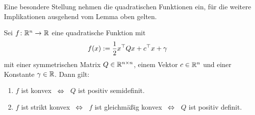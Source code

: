 
Eine besondere Stellung nehmen die quadratischen Funktionen ein, für die weitere Implikationen ausgehend vom Lemma oben gelten.

\begin{lemma} \label{lemma: quadratischeFunktion}
	Sei $\abb{f}{\Rn}{\R}$ eine quadratische Funktion mit
	\begin{align*}
		f(x) \mathrel{:=} \frac{1}{2} x^{\top} Q x + c^{\top} x + \gamma
	\end{align*}
	mit einer symmetrischen Matrix $Q \in \mathbb{R}^{n \times n}$, einem Vektor $c \in \mathbb{R}^n$ und einer Konstante $\gamma \in \mathbb{R}$. Dann gilt:
	\begin{enumerate}[leftmargin=*, label=(\roman*), nolistsep]
		\item $f$ ist konvex $\enskip \Leftrightarrow \enskip$ $Q$ ist positiv semidefinit.
		\item $f$ ist strikt konvex $\enskip \Leftrightarrow \enskip$ $f$ ist gleichmäßig konvex $\enskip \Leftrightarrow \enskip$ $Q$ ist positiv definit.
	\end{enumerate}
\end{lemma}

